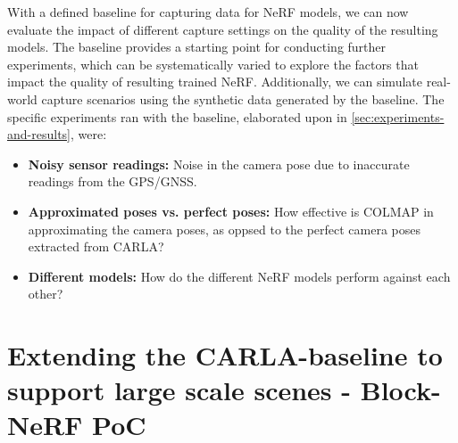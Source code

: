 With a defined baseline for capturing data for NeRF models, we can now evaluate the impact of different capture settings on the quality of the resulting models. The baseline provides a starting point for conducting further experiments, which can be systematically varied to explore the factors that impact the quality of resulting trained NeRF. Additionally, we can simulate real-world capture scenarios using the synthetic data generated by the baseline. The specific experiments ran with the baseline, elaborated upon in \autoref{sec:experiments-and-results}, were:

\begin{itemize}
    \item \textbf{Noisy sensor readings:} Noise in the camera pose due to inaccurate readings from the GPS/GNSS.
    \item \textbf{Approximated poses vs. perfect poses:} How effective is COLMAP in approximating the camera poses, as oppsed to the perfect camera poses extracted from CARLA?
    \item \textbf{Different models:} How do the different NeRF models perform against each other?
\end{itemize}




















































\section{Extending the CARLA-baseline to support large scale scenes - Block-NeRF PoC} \label{sec:method-block-nerf}


